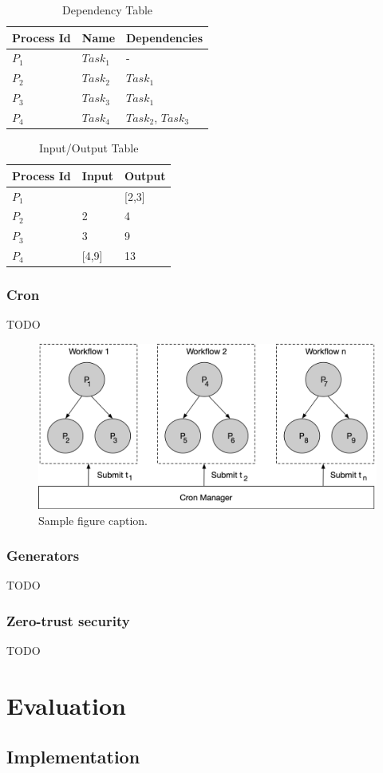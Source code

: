 \documentclass{article}
\begin{document}
\begin{table}[h]
	\caption{Dependency Table}
	\centering
	\begin{tabular}{lll}
		\toprule
		\cmidrule(r){1-2}
        Process Id & Name       & Dependencies           \\
		\midrule
        $P_{1}$    & $Task_{1}$ & -                      \\
        $P_{2}$    & $Task_{2}$ & $Task_{1}$             \\
        $P_{3}$    & $Task_{3}$ & $Task_{1}$             \\
        $P_{4}$    & $Task_{4}$ & $Task_{2}$, $Task_{3}$ \\
		\bottomrule
	\end{tabular}
	\label{tab:table}
\end{table}
	
\begin{table}[h]
	\caption{Input/Output Table}
	\centering
	\begin{tabular}{lll}
		\toprule
		\cmidrule(r){1-2}
        Process Id & Input & Output \\
		\midrule
        $P_{1}$    & & [2,3] \\
        $P_{2}$    & 2 & 4 \\
        $P_{3}$    & 3 & 9 \\
        $P_{4}$    & [4,9] & 13 \\
		\bottomrule
	\end{tabular}
	\label{tab:table}
\end{table}

\subsubsection{Cron}
TODO
\begin{figure}[h]
	\centering
    \includegraphics[scale=0.4]{cron.png}
	\caption{Sample figure caption.}
	\label{fig:fig1}
\end{figure}

\subsubsection{Generators}
TODO

\subsubsection{Zero-trust security}
TODO

\section{Evaluation}
\subsection{Implementation}


 
\end{document}
